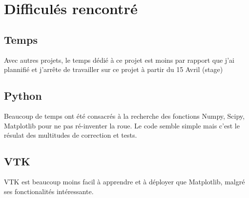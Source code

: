 \documentclass[11pt]{article}
\begin{document}
    \hypertarget{difficuluxe9s-rencontruxe9}{%
\section{Difficulés rencontré}\label{difficuluxe9s-rencontruxe9}}

\hypertarget{temps}{%
\subsection{Temps}\label{temps}}

Avec autres projets, le temps dédié à ce projet est moins par rapport
que j'ai plannifié et j'arrête de travailler sur ce projet à partir du
15 Avril (stage)

\hypertarget{python}{%
\subsection{Python}\label{python}}

Beaucoup de temps ont été consacrés à la recherche des fonctions Numpy,
Scipy, Matplotlib pour ne pas ré-inventer la roue. Le code semble simple
mais c'est le résulat des multitudes de correction et tests.

\hypertarget{vtk}{%
\subsection{VTK}\label{vtk}}

VTK est beaucoup moins facil à apprendre et à déployer que Matplotlib,
malgré ses fonctionalités intéressante.


    
    
    
    
\end{document}
